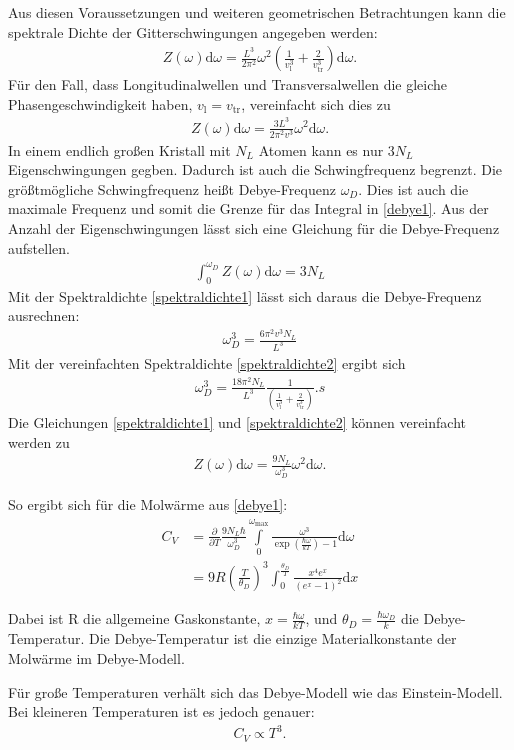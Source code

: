 Aus diesen Voraussetzungen und weiteren geometrischen Betrachtungen kann die spektrale Dichte der Gitterschwingungen angegeben werden:
\begin{align}
	\label{spektraldichte1}
	Z(\omega) \mathrm{d}\omega = \frac{L^3}{2 \pi^2} \omega^2 \left(\frac{1}{v_\mathrm{l}^3} + \frac{2}{v_\mathrm{tr}^3}\right)\mathrm{d}\omega.
\end{align} 
Für den Fall, dass Longitudinalwellen und Transversalwellen die gleiche Phasengeschwindigkeit haben, $v_\mathrm{l} = v_\mathrm{tr}$, vereinfacht sich dies zu
\begin{align}
	\label{spektraldichte2}
	Z(\omega)\mathrm{d}\omega = \frac{3L^3}{2 \pi^2v^3}\omega^2 \mathrm{d}\omega.
\end{align}
In einem endlich großen Kristall mit $N_L$ Atomen kann es nur $3N_L$ Eigenschwingungen gegben.
Dadurch ist auch die Schwingfrequenz begrenzt.
Die größtmögliche Schwingfrequenz heißt Debye-Frequenz $\omega_D$.
Dies ist auch die maximale Frequenz und somit die Grenze für das Integral in \eqref{debye1}.
Aus der Anzahl der Eigenschwingungen lässt sich eine Gleichung für die Debye-Frequenz aufstellen.
\begin{align}
	\int_{0}^{\omega_D}Z(\omega)\mathrm{d}\omega = 3N_L
\end{align}
Mit der Spektraldichte \eqref{spektraldichte1} lässt sich daraus die Debye-Frequenz ausrechnen:
\begin{align}
	\omega_D^3 = \frac{6 \pi^2 v^3 N_L}{L^3}
\end{align}
Mit der vereinfachten Spektraldichte \eqref{spektraldichte2} ergibt sich
\begin{align}
	\omega_D^3 = \frac{18 \pi^2 N_L}{L^3} \frac{1}{\left(\frac{1}{v_\mathrm{l}^3} + \frac{2}{v_\mathrm{tr}^3}\right)}.s
\end{align}
Die Gleichungen \eqref{spektraldichte1} und \eqref{spektraldichte2} können vereinfacht werden zu
\begin{align}
	Z(\omega)\mathrm{d}\omega = \frac{9N_L}{\omega_D^3} \omega^2 \mathrm{d}\omega.
\end{align}

So ergibt sich für die Molwärme aus \eqref{debye1}:
\begin{align}
	C_V & = \frac{\partial}{\partial T}\frac{9N_L \hbar}{\omega_D^3}  \int\limits_{0}^{\omega_\mathrm{max}} \frac{\omega^3}{\exp \left( \frac{\hbar \omega}{kT} \right)-1} \mathrm{d}\omega \\
	& = 9R \left(\frac{T}{\theta_D}\right)^3 \int_0^\frac{\theta_D}{T} \frac{x^4 e^x}{\left(e^x - 1\right)^2} \mathrm{d}x
\end{align}

Dabei ist R die allgemeine Gaskonstante, $x = \frac{\hbar \omega}{kT}$, und $\theta_D = \frac{\hbar \omega_D}{k}$ die Debye-Temperatur.
Die Debye-Temperatur ist die einzige Materialkonstante der Molwärme im Debye-Modell.

Für große Temperaturen verhält sich das Debye-Modell wie das Einstein-Modell.
Bei kleineren Temperaturen ist es jedoch genauer:
\begin{align}
	C_V \propto T^3.
\end{align}